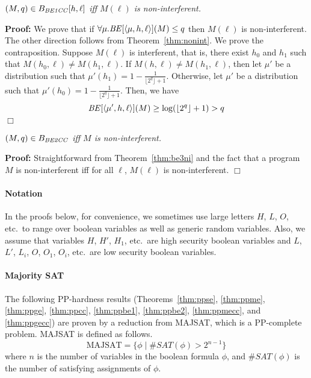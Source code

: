 \documentclass{llncs}
\newenvironment{proof}{\noindent\rm{\bf Proof:}}{\hbox{$\Box$}\vspace*{0.2\baselineskip}}
\newenvironment{reftheorem}[1]{\begin{trivlist}\item[\hskip
      \labelsep{\bf Theorem #1.}]\it}{\end{trivlist}}
\newcommand{\aset}[1]{\{{#1}\}}
\newcommand{\aseq}[1]{\langle#1\rangle}
\begin{document}
\begin{reftheorem}{\ref{thm:be3ni}}
$(M,q) \in B_{\it BE1CC}[h,\ell]$ iff $M(\ell)$ is non-interferent.
\end{reftheorem}
\begin{proof}
  We prove that if $\forall\mu.{\it BE}[\aseq{\mu,h,\ell}](M)\le q$
  then $M(\ell)$ is non-interferent.  The other direction follows from
  Theorem~\ref{thm:nonint}.  We prove the contraposition.  Suppose
  $M(\ell)$ is interferent, that is, there exist $h_0$ and $h_1$ such
  that $M(h_0,\ell)\not=M(h_1,\ell)$. If $M(h,\ell)\not=M(h_1,\ell)$,
  then let $\mu'$ be a distribution such that
  $\mu'(h_1)=1-\frac{1}{\lfloor 2^q\rfloor +1}$.  Otherwise, let
  $\mu'$ be a distribution such that $\mu'(h_0)=1-\frac{1}{\lfloor
    2^q\rfloor +1}$.  Then, we have
\[
{\it BE}[\aseq{\mu',h,\ell}](M)  \ge \log(\lfloor 2^q\rfloor +1)  > q
\]
\end{proof}

\begin{reftheorem}{\ref{thm:be4ni}}
$(M,q) \in B_{\it BE2CC}$ iff $M$ is non-interferent.
\end{reftheorem}
\begin{proof}
Straightforward from Theorem~\ref{thm:be3ni} and the fact that a program $M$ is
non-interferent iff for all $\ell$, $M(\ell)$ is non-interferent.
\end{proof}

\paragraph*{\bf Notation}
In the proofs below, for convenience, we sometimes use large letters
$H$, $L$, $O$, etc.~to range over boolean variables as well as generic
random variables.  Also, we assume that variables $H$, $H'$, $H_1$,
etc.~are high security boolean variables and $L$, $L'$, $L_i$, $O$,
$O_1$, $O_i$, etc.~are low security boolean variables.

\paragraph*{\bf Majority SAT}
The following PP-hardness results (Theorems~\ref{thm:ppse},
\ref{thm:ppme}, \ref{thm:ppge}, \ref{thm:ppcc}, \ref{thm:ppbe1},
\ref{thm:ppbe2}, \ref{thm:ppmecc}, and \ref{thm:ppgecc}) are proven by
a reduction from MAJSAT, which is a PP-complete problem.  MAJSAT is
defined as follows.
\[
\textrm{MAJSAT}=\aset{\phi\mid \#SAT(\phi)>2^{n-1}}
\]
where $n$ is the number of variables in the boolean formula $\phi$, and
$\#SAT(\phi)$ is the number of satisfying assignments of $\phi$.
\end{document}
